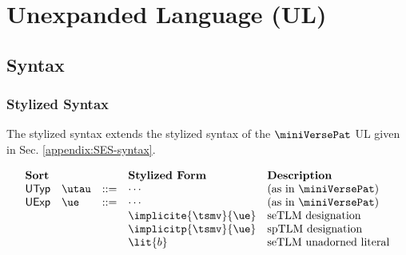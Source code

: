 \section{Unexpanded Language (UL)}
\subsection{Syntax}
\subsubsection{Stylized Syntax}
The stylized syntax extends the stylized syntax of the $\miniVersePat$ UL given in Sec. \ref{appendix:SES-syntax}.

\[\begin{array}{lllllll}
\textbf{Sort} & & 
& \textbf{Stylized Form} & \textbf{Description}\\
\mathsf{UTyp} & \utau & ::= 
& \cdots & \text{(as in $\miniVersePat$)}\\
\mathsf{UExp} & \ue & ::= 
& \cdots & \text{(as in $\miniVersePat$)}\\
&&& \implicite{\tsmv}{\ue} & \text{seTLM designation}\\
&&& \implicitp{\tsmv}{\ue} & \text{spTLM designation}\\
&&& \lit{b} & \text{seTLM unadorned literal}\\

\end{array}\]
